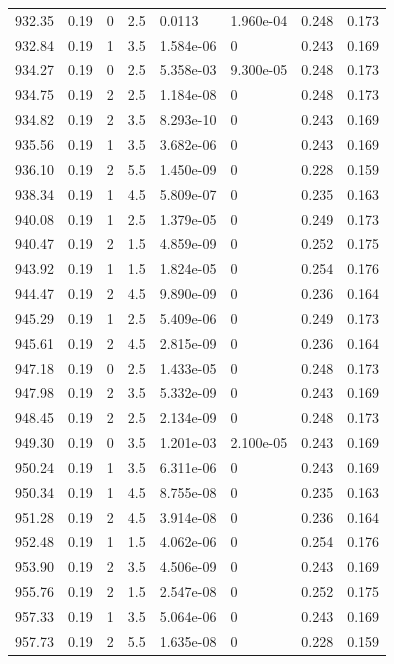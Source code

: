 \documentclass[preview]{standalone}
\begin{document}
{{{{{{{{{{{{{{{{\begin{tabular}{L{1.2cm}C{1.2cm} C{0.3cm}C{0.5cm} C{1.4cm}C{1.4cm} C{1.4cm}C{1.4cm}}
  932.35  &  0.19  & 0     & 2.5 &  0.0113  & 1.960e-04  & 0.248 &  0.173   \\ 
  932.84  &  0.19  & 1     & 3.5 &  1.584e-06  & 0  & 0.243 &  0.169   \\ 
  934.27  &  0.19  & 0     & 2.5 &  5.358e-03  & 9.300e-05  & 0.248 &  0.173   \\ 
  934.75  &  0.19  & 2     & 2.5 &  1.184e-08  & 0  & 0.248 &  0.173   \\ 
  934.82  &  0.19  & 2     & 3.5 &  8.293e-10  & 0  & 0.243 &  0.169   \\ 
  935.56  &  0.19  & 1     & 3.5 &  3.682e-06  & 0  & 0.243 &  0.169   \\ 
  936.10  &  0.19  & 2     & 5.5 &  1.450e-09  & 0  & 0.228 &  0.159   \\ 
  938.34  &  0.19  & 1     & 4.5 &  5.809e-07  & 0  & 0.235 &  0.163   \\ 
  940.08  &  0.19  & 1     & 2.5 &  1.379e-05  & 0  & 0.249 &  0.173   \\ 
  940.47  &  0.19  & 2     & 1.5 &  4.859e-09  & 0  & 0.252 &  0.175   \\ 
  943.92  &  0.19  & 1     & 1.5 &  1.824e-05  & 0  & 0.254 &  0.176   \\ 
  944.47  &  0.19  & 2     & 4.5 &  9.890e-09  & 0  & 0.236 &  0.164   \\ 
  945.29  &  0.19  & 1     & 2.5 &  5.409e-06  & 0  & 0.249 &  0.173   \\ 
  945.61  &  0.19  & 2     & 4.5 &  2.815e-09  & 0  & 0.236 &  0.164   \\ 
  947.18  &  0.19  & 0     & 2.5 &  1.433e-05  & 0  & 0.248 &  0.173   \\ 
  947.98  &  0.19  & 2     & 3.5 &  5.332e-09  & 0  & 0.243 &  0.169   \\ 
  948.45  &  0.19  & 2     & 2.5 &  2.134e-09  & 0  & 0.248 &  0.173   \\ 
  949.30  &  0.19  & 0     & 3.5 &  1.201e-03  & 2.100e-05  & 0.243 &  0.169   \\ 
  950.24  &  0.19  & 1     & 3.5 &  6.311e-06  & 0  & 0.243 &  0.169   \\ 
  950.34  &  0.19  & 1     & 4.5 &  8.755e-08  & 0  & 0.235 &  0.163   \\ 
  951.28  &  0.19  & 2     & 4.5 &  3.914e-08  & 0  & 0.236 &  0.164   \\ 
  952.48  &  0.19  & 1     & 1.5 &  4.062e-06  & 0  & 0.254 &  0.176   \\ 
  953.90  &  0.19  & 2     & 3.5 &  4.506e-09  & 0  & 0.243 &  0.169   \\ 
  955.76  &  0.19  & 2     & 1.5 &  2.547e-08  & 0  & 0.252 &  0.175   \\ 
  957.33  &  0.19  & 1     & 3.5 &  5.064e-06  & 0  & 0.243 &  0.169   \\ 
  957.73  &  0.19  & 2     & 5.5 &  1.635e-08  & 0  & 0.228 &  0.159   \\ 
\hline 
\end{tabular} 

}}}}}}}}}}}}}}}}
\end{document}
